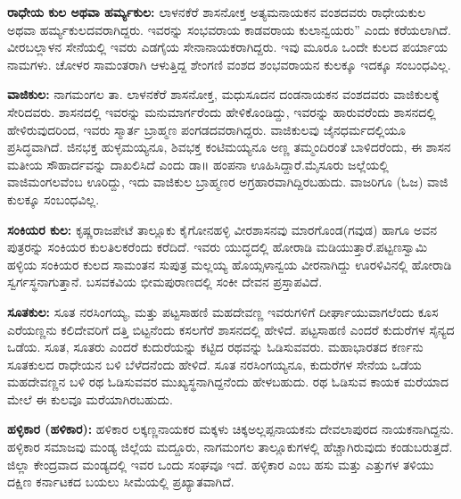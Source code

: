 \textbf{ರಾಧೇಯ ಕುಲ ಅಥವಾ ಹರ್ಮ್ಯಕುಲ:} ಲಾಳನಕೆರೆ ಶಾಸನೋಕ್ತ ಅತ್ಯಮನಾಯಕನ ವಂಶದವರು ರಾಧೇಯಕುಲ ಅಥವಾ ಹರ್ಮ್ಯಕುಲದವರಾಗಿದ್ದರು. ಇವರನ್ನು ಸಂಭವರಾಯ ಕಾಡವರಾಯ ಕುಲಾನ್ವಯರು” ಎಂದು ಕರೆಯಲಾಗಿದೆ. ವೀರಬಲ್ಲಾಳನ ಸೇನೆಯಲ್ಲಿ ಇವರು ಎಡಗೈಯ ಸೇನಾನಾಯಕರಾಗಿದ್ದರು. ಇವು ಮೂರೂ ಒಂದೇ ಕುಲದ ಪರ್ಯಾಯ ನಾಮಗಳು. ಚೋಳರ ಸಾಮಂತರಾಗಿ ಆಳುತ್ತಿದ್ದ ಶೇಂಗಣಿ ವಂಶದ ಶಂಭವರಾಯನ ಕುಲಕ್ಕೂ ಇದಕ್ಕೂ ಸಂಬಂಧವಿಲ್ಲ.

\textbf{ವಾಜಿಕುಲ:} ನಾಗಮಂಗಲ ತಾ. ಲಾಳನಕೆರೆ ಶಾಸನೋಕ್ತ, ಮಧುಸೂದನ ದಂಡನಾಯಕನ ವಂಶದವರು ವಾಜಿಕುಲಕ್ಕೆ ಸೇರಿದವರು. ಶಾಸನದಲ್ಲಿ ಇವರನ್ನು ಮನುಮಾರ್ಗರೆಂದು ಹೇಳಿಕೊಂಡಿದ್ದು, ಇವರನ್ನು ಹಾರುವರೆಂದು ಶಾಸನದಲ್ಲಿ ಹೇಳಿರುವುದರಿಂದ, ಇವರು ಸ್ಮಾರ್ತ ಬ್ರಾಹ್ಮಣ ಪಂಗಡದವರಾಗಿದ್ದರು. ವಾಜಿಕುಲವು ಜೈನಧರ್ಮದಲ್ಲಿಯೂ ಪ್ರಸಿದ್ಧವಾಗಿದೆ. ಜಿನಭಕ್ತ ಹುಳ್ಳಮಯ್ಯನೂ, ಶಿವಭಕ್ತ ಕಂಟಿಮಯ್ಯನೂ ಅಣ್ಣ ತಮ್ಮಂದಿರಂತೆ ಬಾಳಿದರೆಂದು, ಈ ಶಾಸನ ಮತೀಯ ಸೌಹಾರ್ದವನ್ನು ದಾಖಲಿಸಿದೆ ಎಂದು ಡಾ॥ ಹಂಪನಾ ಊಹಿಸಿದ್ದಾರೆ.ಮೈಸೂರು ಜಲ್ಲೆಯಲ್ಲಿ ವಾಜಿಮಂಗಲವೆಂಬ ಊರಿದ್ದು, ಇದು ವಾಜಿಕುಲ ಬ್ರಾಹ್ಮಣರ ಅಗ್ರಹಾರವಾಗಿದ್ದಿರಬಹುದು. ವಾಜರಿಗೂ (ಓಜ) ವಾಜಿ ಕುಲಕ್ಕೂ ಸಂಬಂಧವಿಲ್ಲ.

\textbf{ಸಂಕಿಯರ ಕುಲ:} ಕೃಷ್ಣರಾಜಪೇಟೆ ತಾಲ್ಲೂಕು ಕೈಗೋನಹಳ್ಳಿ ವೀರಶಾಸನವು ಮಾರಗೊಂಡ(ಗವುಡ) ಹಾಗೂ ಅವನ ಪುತ್ರರನ್ನು ಸಂಕಿಯರ ಕುಲತಿಲಕರೆಂದು ಕರೆದಿದೆ. ಇವರು ಯುದ್ಧದಲ್ಲಿ ಹೋರಾಡಿ ಮಡಿಯುತ್ತಾರೆ.ಪಟ್ಟಣಸ್ವಾಮಿ ಹಳ್ಳಿಯ ಸಂಕಿಯರ ಕುಲದ ಸಾಮಂತನ ಸುಪುತ್ರ ಮಲ್ಲಯ್ಯ ಹೊಯ್ಸಳಾನ್ವಯ ವೀರನಾಗಿದ್ದು ಊರಳಿವಿನಲ್ಲಿ ಹೋರಾಡಿ ಸ್ವರ್ಗಸ್ಥನಾಗುತ್ತಾನೆ. ಬಸವಕವಿಯ ಭೀಮಪುರಾಣದಲ್ಲಿ ಸಂಕೀ ದೇವನ ಪ್ರಸ್ತಾಪವಿದೆ.

\textbf{ಸೂತಕುಲ:} ಸೂತ ನರಸಿಂಗಯ್ಯ, ಮತ್ತು ಪಟ್ಟಸಾಹಣಿ ಮಹದೇವಣ್ಣ ಇವರುಗಳಿಗೆ ದೀರ್ಘಾಯುವಾಗಲೆಂದು ಕೂಸ ಎರೆಯಣ್ಣನು ಕಲಿದೇವರಿಗೆ ದತ್ತಿ ಬಿಟ್ಟನೆಂದು ಕಸಲಗೆರೆ ಶಾಸನದಲ್ಲಿ ಹೇಳಿದೆ. ಪಟ್ಟಸಾಹಣಿ ಎಂದರೆ ಕುದುರೆಗಳ ಸೈನ್ಯದ ಒಡೆಯ. ಸೂತ, ಸೂತರು ಎಂದರೆ ಕುದುರೆಯನ್ನು ಕಟ್ಟಿದ ರಥವನ್ನು ಓಡಿಸುವವರು. ಮಹಾಭಾರತದ ಕರ್ಣನು ಸೂತಕುಲದ ರಾಧೇಯನ ಬಳಿ ಬೆಳೆದನೆಂದು ಹೇಳಿದೆ. ಸೂತ ನರಸಿಂಗಯ್ಯನೂ, ಕುದುರೆಗಳ ಸೇನೆಯ ಒಡೆಯ ಮಹದೇವಣ್ಣನ ಬಳಿ ರಥ ಓಡಿಸುವವರ ಮುಖ್ಯಸ್ಥನಾಗಿದ್ದನೆಂದು ಹೇಳಬಹುದು. ರಥ ಓಡಿಸುವ ಕಾಯಕ ಮರೆಯಾದ ಮೇಲೆ ಈ ಕುಲವೂ ಮರೆಯಾಗಿರಬಹುದು.

\textbf{ಹಳ್ಳಿಕಾರ (ಹಳಿಕಾರ):} ಹಳಿಕಾರ ಲಕ್ಕಣ್ಣನಾಯಕರ ಮಕ್ಕಳು ಚಿಕ್ಕಅಲ್ಲಪ್ಪನಾಯಕನು ದೇವಲಾಪುರದ ನಾಯಕ\-ನಾಗಿದ್ದನು. ಹಳ್ಳಿಕಾರ ಸಮಾಜವು ಮಂಡ್ಯ ಜಿಲ್ಲೆಯ ಮದ್ದೂರು, ನಾಗಮಂಗಲ ತಾಲ್ಲೂಕುಗಳಲ್ಲಿ ಹೆಚ್ಚಾಗಿರುವುದು ಕಂಡುಬರುತ್ತದೆ. ಜಿಲ್ಲಾ ಕೇಂದ್ರವಾದ ಮಂಡ್ಯದಲ್ಲಿ ಇವರ ಒಂದು ಸಂಘವೂ ಇದೆ. ಹಳ್ಳಿಕಾರ ಎಂಬ ಹಸು ಮತ್ತು ಎತ್ತುಗಳ ತಳಿಯು ದಕ್ಷಿಣ ಕರ್ನಾಟಕದ ಬಯಲು ಸೀಮೆಯಲ್ಲಿ ಪ್ರಖ್ಯಾತವಾಗಿದೆ.

